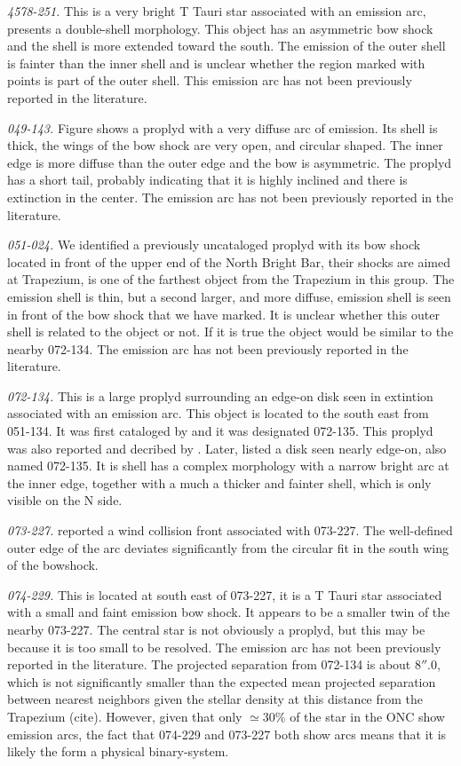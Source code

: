 \documentclass[iop, apj]{emulateapj}
\begin{document}
\textit{4578-251.} This  is a very bright T Tauri star associated with an emission arc, presents a double-shell morphology. This object has an asymmetric bow shock and the shell is more extended toward the south. The emission of the outer shell is fainter than the inner shell and is unclear whether the region marked with points is part of the outer shell. This emission arc has not been previously reported in the literature. 

\textit{049-143.} Figure shows a proplyd with a very diffuse arc of emission. Its shell is thick, the wings of the bow shock are very open, and circular shaped. The inner edge is more diffuse than the outer edge and the bow is asymmetric. The  proplyd has a short tail, probably indicating that it is highly inclined and there is extinction in the center. The emission arc has not been previously reported in the literature.  
 
\textit{051-024.} We identified a previously uncataloged proplyd with its bow shock located in front of the upper end of the North Bright Bar, their shocks are aimed at Trapezium, is one of the farthest object from the Trapezium in this group. The emission shell is thin, but a second larger, and more diffuse, emission shell is seen in front of the bow shock that we have marked. It is unclear whether this outer shell is related to the object or not. If it is true the object would be similar to the nearby 072-134. The emission arc has not been previously reported in the literature. 

\textit{072-134.} This is a large proplyd surrounding an edge-on disk seen in extintion associated with an emission arc. This object is located to the south east from 051-134. It was first cataloged by \citet{ODell:1996a} and it was designated 072-135. This proplyd was also reported and decribed by \citet{Bally:2000a}. Later, \citet{Ricci:2008a} listed a disk seen nearly edge-on, also named 072-135. It is shell has a complex morphology with a narrow bright arc at the inner edge, together with a much a thicker and fainter shell, which is only visible on the N side.         

\textit{073-227.} \citet{Bally:2000a} reported a wind collision front associated with 073-227. The well-defined outer edge of the arc deviates significantly from the circular fit in the south wing of the bowshock.
   
\textit{074-229.} This is located at south east of 073-227, it is a T Tauri star associated with a small and faint emission bow shock. It appears to be a smaller twin of the nearby 073-227. The central star is not obviously a proplyd, but this may be because it is too small to be resolved. The emission arc has not been previously reported in the literature. The projected separation from 072-134 is about \(8''.0\), which is not significantly smaller than the expected mean projected separation between nearest neighbors given the stellar density at this distance from the Trapezium (cite). However, given that only \(\simeq30\%\) of the star in the ONC show emission arcs, the fact that 074-229 and 073-227 both show arcs means that it is likely the form a  physical binary-system.
 
\end{document}
